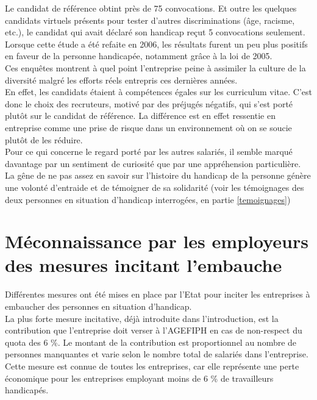 Le candidat de référence obtint près de 75 convocations.
Et outre les quelques candidats virtuels présents pour tester d'autres discriminations (\^age, racisme, etc.), le candidat qui avait déclaré son handicap reçut 5 convocations seulement.\\

Lorsque cette étude a été refaite en 2006, les résultats furent un peu plus positifs en faveur de la personne handicapée, notamment gr\^ace à la loi de 2005.\\

Ces enqu\^etes montrent à quel point l'entreprise peine à assimiler la culture de la diversité malgré les efforts réels entrepris ces dernières années. \\
En effet, les candidats étaient à compétences égales sur les curriculum vitae. C'est donc le choix des recruteurs, motivé par des préjugés négatifs, qui s'est porté plut\^ot sur le candidat de référence. La différence est en effet ressentie en entreprise comme une prise de risque dans un environnement où on se soucie plutôt de les réduire.\\

Pour ce qui concerne le regard porté par les autres salariés, il semble marqué davantage par un sentiment de curiosité que par une appréhension particulière. La gêne de ne pas assez en savoir sur l'histoire du handicap de la personne génère une volonté d'entraide et de témoigner de sa solidarité (voir les témoignages des deux personnes en situation d'handicap interrogées, en partie \ref{temoignages})


\section{Méconnaissance par les employeurs des mesures incitant l'embauche}
\label{mesuresIncitatives}

Différentes mesures ont été mises en place par l'Etat pour inciter les entreprises à embaucher des personnes en situation d'handicap. \\

La plus forte mesure incitative, déjà introduite dans l'introduction, est la contribution que l'entreprise doit verser à l'AGEFIPH en cas de non-respect du quota des 6 \%. Le montant de la contribution est proportionnel au nombre de personnes manquantes et varie selon le nombre total de salariés dans l'entreprise.
Cette mesure est connue de toutes les entreprises, car elle représente une perte économique pour les entreprises employant moins de 6 \% de travailleurs handicapés.\\

